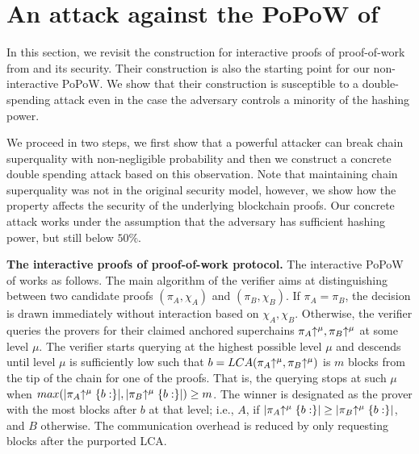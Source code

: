 \section{An attack against the PoPoW of \cite{KLS}}
\label{sec:attack}

In this section, we revisit the construction for interactive proofs of
proof-of-work from \cite{KLS} and its security.  Their construction is also the
starting point for our non-interactive PoPoW. We show that their
construction is susceptible to  a double-spending attack even in the case the
adversary controls a minority of the hashing power.

We proceed in two steps, we first show that a powerful attacker can break chain superquality with
non-negligible probability and then we construct a concrete double spending 
attack based on this observation.
Note that maintaining   chain superquality was  not in the original security model,  however,
we show how the property affects the security of the underlying blockchain proofs. Our  concrete attack works
under the assumption that the adversary has sufficient hashing power, but still
below $50\%$.

\noindent
\textbf{The interactive proofs of proof-of-work protocol.}
The interactive PoPoW of \cite{KLS} works as follows. The main algorithm of the verifier aims at distinguishing 
between two candidate proofs $(\pi_A, \chi_A)$ and $(\pi_B, \chi_B)$. If $\pi_A =
\pi_B$, the decision is drawn immediately without interaction based on
$\chi_A,\chi_B$. Otherwise, the verifier queries the provers for their claimed
anchored superchains $\pi_A\negthickspace\uparrow^\mu, \pi_B\negthickspace\uparrow^\mu$ at some level $\mu$.
The verifier starts querying at the highest possible level $\mu$ and descends
until level $\mu$ is sufficiently low such that $b = LCA(\pi_A\negthickspace\uparrow^\mu,
\pi_B\negthickspace\uparrow^\mu)$ is $m$ blocks from the tip of the chain for one of the proofs.
That is,
the querying stops at such $\mu$ when $max(|\pi_A\negthickspace\uparrow^\mu\{b:\}|,
|\pi_B\negthickspace\uparrow^\mu\{b:\}|) \geq m$. The winner is designated as the prover with
the most blocks after $b$ at that level; i.e., $A$, if $|\pi_A\negthickspace\uparrow^\mu\{b:\}|
\geq |\pi_B\negthickspace\uparrow^\mu\{b:\}|$, and $B$ otherwise. The communication overhead
is reduced by only requesting blocks after the purported LCA.

